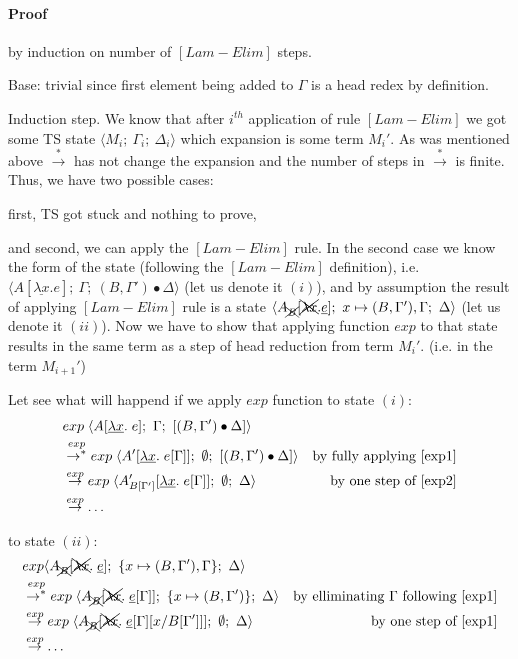 \documentclass[a4paper, 10pt]{article}
\begin{document}
\paragraph{Proof} by induction on number of $[Lam-Elim]$ steps.

Base: trivial since first element being added to $\Gamma$ is a head redex by definition.

Induction step. We know that after $i^{th}$ application of rule $[Lam-Elim]$ we got some TS state $\langle M_i;\ \Gamma_i;\ \Delta_i \rangle$ which expansion is some term $M_i'$. As was mentioned above $\overset{*}{\rightarrow}$ has not change the expansion and the number of steps in $\overset{*}{\rightarrow}$ is finite. Thus, we have two possible cases:

first, TS got stuck and nothing to prove,

and second, we can apply the $[Lam-Elim]$ rule. In the second case we know the form of the state (following the $[Lam-Elim]$ definition), i.e. $\langle A[\underline{\lambda x}. e];\ \Gamma;\ (B,\Gamma')\bullet\Delta \rangle$ (let us denote it $(i)$), and by assumption the result of applying $[Lam-Elim]$ rule is a state $\langle A_{\xcancel{B}}[\xcancel{\lambda x}.\underline{e}];\ x \mapsto (B,\Gamma'),\Gamma;\ \Delta \rangle$ (let us denote it $(ii)$). Now we have to show that applying function $exp$ to that state results in the same term as a step of head reduction from term $M_i'$. (i.e. in the term $M_{i+1}'$)

Let see what will happend if we apply $exp$ function to state $(i)$:
\begin{align}
  &exp\; \langle A[\underline{\lambda x}.\; e];\ \Gamma;\ [(B,\Gamma')\bullet\Delta] \rangle & \\
  &\overset{exp}{\rightarrow^{*}}
  exp\; \langle A'[\underline{\lambda x}.\; e[\Gamma]];\ \emptyset;\ [(B,\Gamma')\bullet\Delta] \rangle
  &\textnormal{by fully applying \eqref{exp1}} \\
  \label{i3} &\overset{exp}{\rightarrow}
  exp\; \langle A'_{B[\Gamma']}[\underline{\lambda x}.\; e[\Gamma]];\ \emptyset;\ \Delta \rangle
  &\textnormal{by one step of \eqref{exp2}} \\
  &\overset{exp}{\rightarrow}
  \dots &
\end{align}

to state $(ii)$:
\begin{align}
  &exp \langle A_{\xcancel{B}}[\xcancel{\lambda x}.\; \underline{e}];\ \{x \mapsto (B,\Gamma'),\Gamma\};\ \Delta \rangle & \\
  &\overset{exp}{\rightarrow^{*}}
  exp\;\langle A_{\xcancel{B}}[\xcancel{\lambda x}.\; \underline{e}[\Gamma]];\ \{x \mapsto (B,\Gamma')\};\
  \Delta \rangle &\textnormal{by elliminating $\Gamma$ following \eqref{exp1}} \\
  \label{ii3} &\overset{exp}{\rightarrow}
  exp\; \langle A_{\xcancel{B}}[\xcancel{\lambda x}.\; \underline{e}[\Gamma][x/B[\Gamma']]];\ \emptyset;\
  \Delta \rangle &\textnormal{by one step of \eqref{exp1}} \\
  &\overset{exp}{\rightarrow}
  \dots &
\end{align}
\end{document}
